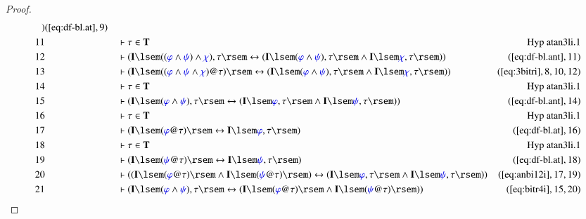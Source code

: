\begin{proof}
\begin{align}
      )&(\mbox{\ref{eq:df-bl.at}},9)\notag
  \\ 11 &&  & \vdash \tau \in
      \mathbf{T}&\text{Hyp~atan3li.1}\notag%
  \\ 12 &&  & \vdash ( \mathbf{I} \lsem ( ( \mw{\varphi} \wedge \mw{\psi} )
      \wedge \mw{\chi} ) , \tau \rsem \leftrightarrow (
      \mathbf{I} \lsem ( \mw{\varphi} \wedge \mw{\psi} ) ,
      \tau \rsem \wedge \mathbf{I} \lsem \mw{\chi} , \tau
      \rsem ) )&(\mbox{\ref{eq:df-bl.ant}},11)\notag
  \\ 13 &&  & \vdash ( \mathbf{I} \lsem ( ( \mw{\varphi} \wedge \mw{\psi}
      \wedge \mw{\chi} ) @ \tau ) \rsem \leftrightarrow (
      \mathbf{I} \lsem ( \mw{\varphi} \wedge \mw{\psi} ) ,
      \tau \rsem \wedge \mathbf{I} \lsem \mw{\chi} , \tau
      \rsem ) )&(\mbox{\ref{eq:3bitri}},8,10,12)\notag
  \\ 14 &&  & \vdash \tau \in
      \mathbf{T}&\text{Hyp~atan3li.1}\notag%
  \\ 15 &&  & \vdash ( \mathbf{I} \lsem ( \mw{\varphi} \wedge \mw{\psi} ) ,
      \tau \rsem \leftrightarrow ( \mathbf{I} \lsem
      \mw{\varphi} , \tau \rsem \wedge \mathbf{I} \lsem
      \mw{\psi} , \tau \rsem )
      )&(\mbox{\ref{eq:df-bl.ant}},14)\notag
  \\ 16 &&  & \vdash \tau \in
      \mathbf{T}&\text{Hyp~atan3li.1}\notag%
  \\ 17 &&  & \vdash ( \mathbf{I} \lsem ( \mw{\varphi} @ \tau ) \rsem
      \leftrightarrow \mathbf{I} \lsem \mw{\varphi} , \tau
      \rsem )&(\mbox{\ref{eq:df-bl.at}},16)\notag
  \\ 18 &&  & \vdash \tau \in
      \mathbf{T}&\text{Hyp~atan3li.1}\notag%
  \\ 19 &&  & \vdash ( \mathbf{I} \lsem ( \mw{\psi} @ \tau ) \rsem
      \leftrightarrow \mathbf{I} \lsem \mw{\psi} , \tau
      \rsem )&(\mbox{\ref{eq:df-bl.at}},18)\notag
  \\ 20 &&  & \vdash ( ( \mathbf{I} \lsem ( \mw{\varphi} @ \tau ) \rsem \wedge
      \mathbf{I} \lsem ( \mw{\psi} @ \tau ) \rsem )
      \leftrightarrow ( \mathbf{I} \lsem \mw{\varphi} ,
      \tau \rsem \wedge \mathbf{I} \lsem \mw{\psi} , \tau
      \rsem ) )&(\mbox{\ref{eq:anbi12i}},17,19)\notag
  \\ 21 &&  & \vdash ( \mathbf{I} \lsem ( \mw{\varphi} \wedge \mw{\psi} ) ,
      \tau \rsem \leftrightarrow ( \mathbf{I} \lsem (
      \mw{\varphi} @ \tau ) \rsem \wedge \mathbf{I} \lsem (
      \mw{\psi} @ \tau ) \rsem )
      )&(\mbox{\ref{eq:bitr4i}},15,20)\notag

\end{align}
\end{proof}
